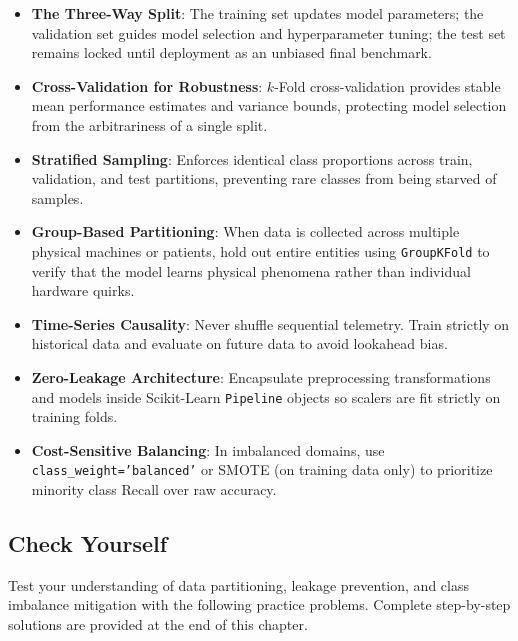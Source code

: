 \begin{takeaways}
\begin{itemize}
    \item \textbf{The Three-Way Split}: The training set updates model parameters; the validation set guides model selection and hyperparameter tuning; the test set remains locked until deployment as an unbiased final benchmark.
    \item \textbf{Cross-Validation for Robustness}: $k$-Fold cross-validation provides stable mean performance estimates and variance bounds, protecting model selection from the arbitrariness of a single split.
    \item \textbf{Stratified Sampling}: Enforces identical class proportions across train, validation, and test partitions, preventing rare classes from being starved of samples.
    \item \textbf{Group-Based Partitioning}: When data is collected across multiple physical machines or patients, hold out entire entities using \texttt{GroupKFold} to verify that the model learns physical phenomena rather than individual hardware quirks.
    \item \textbf{Time-Series Causality}: Never shuffle sequential telemetry. Train strictly on historical data and evaluate on future data to avoid lookahead bias.
    \item \textbf{Zero-Leakage Architecture}: Encapsulate preprocessing transformations and models inside Scikit-Learn \texttt{Pipeline} objects so scalers are fit strictly on training folds.
    \item \textbf{Cost-Sensitive Balancing}: In imbalanced domains, use \texttt{class\_weight='balanced'} or SMOTE (on training data only) to prioritize minority class Recall over raw accuracy.
\end{itemize}
\end{takeaways}

\subsection{Check Yourself}\label{subsec:splitting_check_yourself}

Test your understanding of data partitioning, leakage prevention, and class imbalance mitigation with the following practice problems. Complete step-by-step solutions are provided at the end of this chapter.

